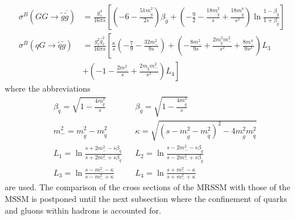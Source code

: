 \begin{align}
\sigma^B(GG \to \tilde{g}\overline{\tilde{g}}) &= \frac{g_s^4}{16\pi s} \left[ \left( -6 - \frac{51 m_{\tilde{g}}^2}{2s} \right)\beta_{\tilde{g}} + \left( -\frac{9}{2} - \frac{18 m_{\tilde{g}}^2}{s} + \frac{18 m_{\tilde{g}}^4}{s^2} \right)\ln \frac{1-\beta_{\tilde{g}}}{1+\beta_{\tilde{g}}} \right]\\
\sigma^B(q G \to \tilde{q} \tilde{g}) &= \frac{g_s^2\hat{g}_s^2}{16\pi s} \left[ \frac{\kappa}{s}\left( -\frac{7}{9} - \frac{32 m_{-}^2}{9s} \right) + \left( -\frac{8m_-^2}{9s} + \frac{2m_{\tilde{q}}^2m_-^2}{s^2} + \frac{8 m_-^4}{9s^2} \right)L_3\right.\nonumber\\
&+\left. \left( -1-\frac{2m_-^2}{s} + \frac{2m_{\tilde{q}}m_-^2}{s^2} \right)L_4 \right]
\end{align}
where the abbreviations \cite{Beenakker:1996ch} 
\begin{align}
&\beta_{\tilde{q}} = \sqrt{1-\frac{4 m_{\tilde{q}}^2}{s}} && \beta_{\tilde{g}} = \sqrt{1-\frac{4 m_{\tilde{g}}^2}{s}}\nonumber\\
&m_-^2 = m_{\tilde{g}}^2 - m_{\tilde{q}}^2 && \kappa = \sqrt{(s-m_{\tilde{g}}^2-m_{\tilde{q}}^2)^2-4m_{\tilde{g}}^2m_{\tilde{q}}^2}\nonumber\\
& L_1 = \ln \frac{s+2m_-^2 - s\beta_{\tilde{q}}}{s+2m_-^2 + s\beta_{\tilde{q}}} && L_2= \ln \frac{s - 2m_-^2 - s\beta_{\tilde{g}}}{s - 2m_-^2 + s\beta_{\tilde{g}}}\nonumber\\
& L_3 = \ln \frac{s - m_-^2 - \kappa}{s - m_-^2 + \kappa} && L_4= \ln \frac{s + m_-^2 - \kappa}{s + m_-^2 + \kappa}
\end{align}
are used. The comparison of the cross sections of the MRSSM with those of the MSSM is postponed until the next subsection where the confinement of quarks and gluons within hadrons is accounted for.



